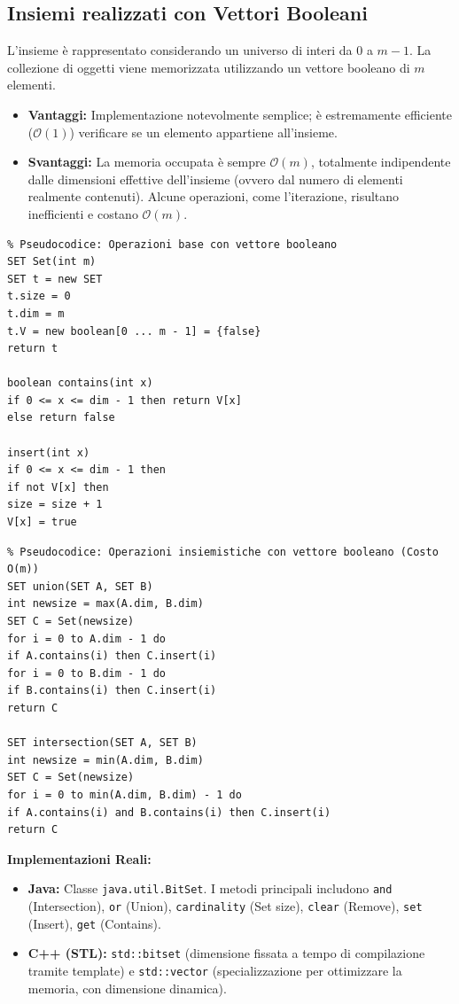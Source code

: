\documentclass[12pt, a4paper]{article}
\begin{document}
\subsection{Insiemi realizzati con Vettori Booleani}
L'insieme è rappresentato considerando un universo di interi da $0$ a $m-1$. La collezione di oggetti viene memorizzata utilizzando un vettore booleano di $m$ elementi.
\begin{itemize}
\item \textbf{Vantaggi:} Implementazione notevolmente semplice; è estremamente efficiente ($\mathcal{O}(1)$) verificare se un elemento appartiene all'insieme.
\item \textbf{Svantaggi:} La memoria occupata è sempre $\mathcal{O}(m)$, totalmente indipendente dalle dimensioni effettive dell'insieme (ovvero dal numero di elementi realmente contenuti). Alcune operazioni, come l'iterazione, risultano inefficienti e costano $\mathcal{O}(m)$.
\end{itemize}

\begin{verbatim}
% Pseudocodice: Operazioni base con vettore booleano
SET Set(int m)
SET t = new SET
t.size = 0
t.dim = m
t.V = new boolean[0 ... m - 1] = {false}
return t

boolean contains(int x)
if 0 <= x <= dim - 1 then return V[x]
else return false

insert(int x)
if 0 <= x <= dim - 1 then
if not V[x] then
size = size + 1
V[x] = true
\end{verbatim}

\begin{verbatim}
% Pseudocodice: Operazioni insiemistiche con vettore booleano (Costo O(m))
SET union(SET A, SET B)
int newsize = max(A.dim, B.dim)
SET C = Set(newsize)
for i = 0 to A.dim - 1 do
if A.contains(i) then C.insert(i)
for i = 0 to B.dim - 1 do
if B.contains(i) then C.insert(i)
return C

SET intersection(SET A, SET B)
int newsize = min(A.dim, B.dim)
SET C = Set(newsize)
for i = 0 to min(A.dim, B.dim) - 1 do
if A.contains(i) and B.contains(i) then C.insert(i)
return C
\end{verbatim}

\textbf{Implementazioni Reali:}
\begin{itemize}
\item \textbf{Java:} Classe \texttt{java.util.BitSet}. I metodi principali includono \texttt{and} (Intersection), \texttt{or} (Union), \texttt{cardinality} (Set size), \texttt{clear} (Remove), \texttt{set} (Insert), \texttt{get} (Contains).
\item \textbf{C++ (STL):} \texttt{std::bitset} (dimensione fissata a tempo di compilazione tramite template) e \texttt{std::vector} (specializzazione per ottimizzare la memoria, con dimensione dinamica).
\end{itemize}
\end{document}
